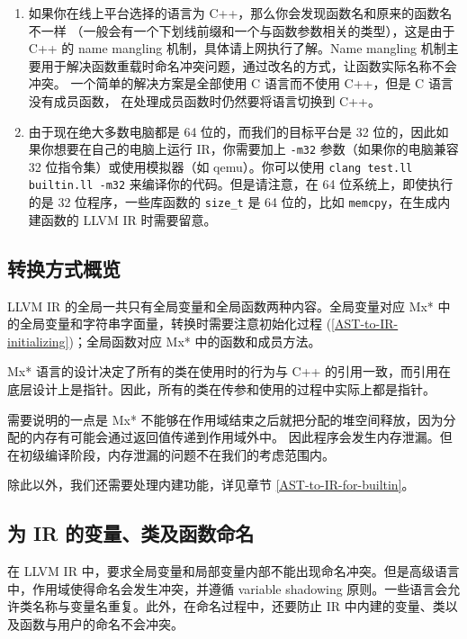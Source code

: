 \begin{remark}
\begin{enumerate}
  \item 如果你在线上平台选择的语言为 C++，那么你会发现函数名和原来的函数名不一样
    （一般会有一个下划线前缀和一个与函数参数相关的类型），这是由于
    C++ 的 name mangling 机制，具体请上网执行了解。Name mangling
    机制主要用于解决函数重载时命名冲突问题，通过改名的方式，让函数实际名称不会冲突。
    一个简单的解决方案是全部使用 C 语言而不使用 C++，但是 C 语言没有成员函数，
    在处理成员函数时仍然要将语言切换到 C++。
  \item 由于现在绝大多数电脑都是 64 位的，而我们的目标平台是 32
    位的，因此如果你想要在自己的电脑上运行 IR，你需要加上 \texttt{-m32} 参数（如果你的电脑兼容
    32 位指令集）或使用模拟器（如 qemu）。你可以使用 \texttt{clang test.ll builtin.ll -m32}
    来编译你的代码。但是请注意，在 64 位系统上，即使执行的是 32 位程序，一些库函数的
    \texttt{size\_t} 是 64 位的，比如 \texttt{memcpy}，在生成内建函数的 LLVM IR 时需要留意。
\end{enumerate}
\end{remark}

\subsection{转换方式概览}\label{AST-to-IR-details}

LLVM IR 的全局一共只有全局变量和全局函数两种内容。全局变量对应 Mx*
中的全局变量和字符串字面量，转换时需要注意初始化过程
(\ref{AST-to-IR-initializing})；全局函数对应 Mx* 中的函数和成员方法。

Mx* 语言的设计决定了所有的类在使用时的行为与 C++
的引用一致，而引用在底层设计上是指针。因此，所有的类在传参和使用的过程中实际上都是指针。

需要说明的一点是 Mx* 不能够在作用域结束之后就把分配的堆空间释放，因为分配的内存有可能会通过返回值传递到作用域外中。
因此程序会发生内存泄漏。但在初级编译阶段，内存泄漏的问题不在我们的考虑范围内。

除此以外，我们还需要处理内建功能，详见章节
\ref{AST-to-IR-for-builtin}。

\subsection{为 IR 的变量、类及函数命名}\label{AST-to-IR-naming}

在 LLVM IR 中，要求全局变量和局部变量内部不能出现命名冲突。但是高级语言中，作用域使得命名会发生冲突，并遵循
variable shadowing 原则。一些语言会允许类名称与变量名重复。此外，在命名过程中，还要防止
IR 中内建的变量、类以及函数与用户的命名不会冲突。


